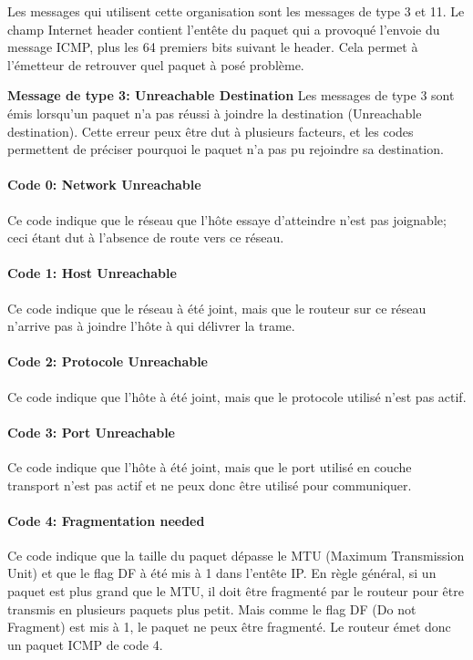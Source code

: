 Les messages qui utilisent cette organisation sont les messages de type 3 et
11.  Le champ Internet header contient l'entête du paquet qui a provoqué
l'envoie du message ICMP, plus les 64 premiers bits suivant le header. Cela
permet à l'émetteur de retrouver quel paquet à posé problème.

\vspace{1cm}
\textbf{Message de type 3: Unreachable Destination}
Les messages de type 3 sont émis lorsqu'un paquet n'a pas réussi à joindre la
destination (Unreachable destination). Cette erreur peux être dut à plusieurs
facteurs, et les codes permettent de préciser pourquoi le paquet n'a pas pu
rejoindre sa destination.

\paragraph{Code 0: Network Unreachable} Ce code indique que le réseau que
l'hôte essaye d'atteindre n'est pas joignable; ceci étant dut à l'absence de
route vers ce réseau.

\paragraph{Code 1: Host Unreachable} Ce code indique que le réseau à été joint,
mais que le routeur sur ce réseau n'arrive pas à joindre l'hôte à qui délivrer
la trame.

\paragraph{Code 2: Protocole Unreachable} Ce code indique que l'hôte à été
joint, mais que le protocole utilisé n'est pas actif.

\paragraph{Code 3: Port Unreachable} Ce code indique que l'hôte à été joint,
mais que le port utilisé en couche transport n'est pas actif et ne peux donc
être utilisé pour communiquer.

\paragraph{Code 4: Fragmentation needed} Ce code indique que la taille du
paquet dépasse le MTU (Maximum Transmission Unit) et que le flag DF à été mis à
1 dans l'entête IP.  En règle général, si un paquet est plus grand que le MTU,
il doit être fragmenté par le routeur pour être transmis en plusieurs paquets
plus petit. Mais comme le flag DF (Do not Fragment) est mis à 1, le paquet ne
peux être fragmenté. Le routeur émet donc un paquet ICMP de code 4.

